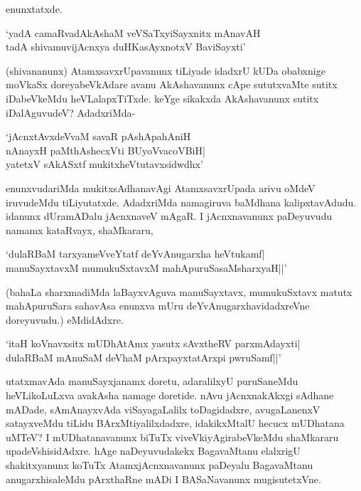 enunxtatxde.

\begin{shloka}
`yadA camaRvadAkAshaM veVSaTxyiSayxnitx mAnavAH\\
tadA shivamuvijAcnxya duHKasAyxnotxV BaviSayxti'
\end{shloka}

(shivananunx) AtamxsavxrUpavanunx tiLiyade idadxrU kUDa obabxnige moVkaSx doreyabeVkAdare avanu AkAshavanunx cApe sututxvaMte sutitx iDabeVkeMdu heVLalapxTiTxde. keYge sikakxda AkAshavanunx sutitx iDalAguvudeV? AdadxriMda-

\begin{shloka}
`jAcnxtAvxdeVvaM savaR pAshApahAniH\\
nAnayxH paMthAshecxVti BUyoVvacoVBiH|\\
yatetxV sAkASxtf mukitxheVtutavxsidwdhx'
\end{shloka}

enunxvudariMda mukitxsAdhanavAgi AtamxsavxrUpada arivu oMdeV iruvudeMdu tiLiyutatxde. AdadxriMda namagiruva baMdhana kalipxtavAdudu. idanunx dUramADalu jAcnxnaveV mAgaR. I jAcnxnavanunx paDeyuvudu namamx kataRvayx, shaMkararu,

\begin{shloka}
`dulaRBaM tarxyameVveYtatf deYvAnugarxha heVtukamf|\\
manuSayxtavxM mumukuSxtavxM mahApuruSasaMsharxyaH||'
\end{shloka}

(bahaLa sharxmadiMda laBayxvAguva manuSayxtavx, mumukuSxtavx matutx mahApuruSara sahavAsa enunxva mUru deYvAnugarxhavidadxreVne doreyuvudu.) eMdidAdxre.

\begin{shloka}
`itaH koVnavxsitx mUDhAtAmx yasutx sAvxtheRV parxmAdayxti|\\
dulaRBaM mAnuSaM deVhaM pArxpayxtatArxpi pwruSamf||'
\end{shloka}

utatxmavAda manuSayxjanamx doretu, adaralilxyU puruSaneMdu heVLikoLuLxva avakAsha namage doretide. nAvu jAcnxnakAkxgi sAdhane mADade, sAmAnayxvAda viSayagaLalilx toDagidadxre, avugaLanenxV satayxveMdu tiLidu BArxMtiyalilxdadxre, idakikxMtalU hecucx mUDhatana uMTeV? I mUDhatanavanunx biTuTx viveVkiyAgirabeVkeMdu shaMkararu upadeVshisidAdxre. hAge naDeyuvudakekx BagavaMtanu elalxrigU shakitxyanunx koTuTx AtamxjAcnxnavanunx paDeyalu BagavaMtanu anugarxhisaleMdu pArxthaRne mADi I BASaNavanunx mugisutetxVne.
